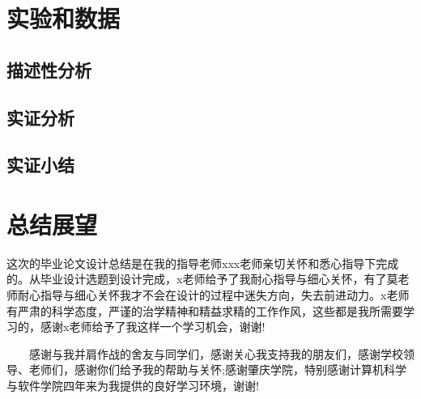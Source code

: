 \documentclass[master]{seuthesis} %
\begin{document}
\begin{Main}
\chapter{实验和数据}
\section{描述性分析}
\section{实证分析}
\section{实证小结}

\chapter{总结展望}

\end{Main} %

\begin{Acknowledgement}{}
这次的毕业论文设计总结是在我的指导老师xxx老师亲切关怀和悉心指导下完成的。从毕业设计选题到设计完成，x老师给予了我耐心指导与细心关怀，有了莫老师耐心指导与细心关怀我才不会在设计的过程中迷失方向，失去前进动力。x老师有严肃的科学态度，严谨的治学精神和精益求精的工作作风，这些都是我所需要学习的，感谢x老师给予了我这样一个学习机会，谢谢!

　　感谢与我并肩作战的舍友与同学们，感谢关心我支持我的朋友们，感谢学校领导、老师们，感谢你们给予我的帮助与关怀;感谢肇庆学院，特别感谢计算机科学与软件学院四年来为我提供的良好学习环境，谢谢!
\end{Acknowledgement}





\newpage
\printindex %



% 
% 
\end{document}
